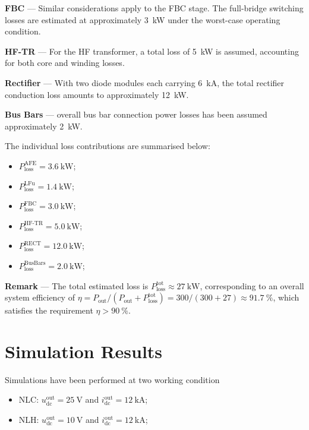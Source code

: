 \documentclass[12pt,a4paper]{scrartcl}
\begin{document}
\begin{onehalfspace}
\noindent\textbf{FBC} --- Similar considerations apply to the FBC stage.
The full-bridge switching losses are estimated at approximately
\SI{3}{\kilo\watt} under the worst-case operating condition.

\noindent\textbf{HF-TR} --- For the HF transformer, a total loss of
\SI{5}{\kilo\watt} is assumed, accounting for both core and winding losses.

\noindent\textbf{Rectifier} --- With two diode modules each carrying
\SI{6}{\kilo\ampere}, the total rectifier conduction loss amounts to
approximately \SI{12}{\kilo\watt}.

\noindent\textbf{Bus Bars} --- overall bus bar connection power losses has been assumed approximately \SI{2}{\kilo\watt}.

\noindent The individual loss contributions are summarised below:
\begin{itemize}
	\item[--] $P_\text{loss}^\text{AFE}   = \SI{3.6}{\kilo\watt}$;
	\item[--] $P_\text{loss}^\text{LFu}   = \SI{1.4}{\kilo\watt}$;
	\item[--] $P_\text{loss}^\text{FBC}   = \SI{3.0}{\kilo\watt}$;
	\item[--] $P_\text{loss}^\text{HF-TR} = \SI{5.0}{\kilo\watt}$;
	\item[--] $P_\text{loss}^\text{RECT}  = \SI{12.0}{\kilo\watt}$;	
	\item[--] $P_\text{loss}^\text{BusBars}  = \SI{2.0}{\kilo\watt}$;
\end{itemize}

\noindent\textbf{Remark} --- The total estimated loss is
$P_\text{loss}^\text{tot} \approx \SI{27}{\kilo\watt}$, corresponding to
an overall system efficiency of
$\eta = P_\text{out}/(P_\text{out}+P_\text{loss}^\text{tot})
= 300/(300+27) \approx \SI{91.7}{\percent}$,
which satisfies the requirement $\eta > \SI{90}{\percent}$.

\section{Simulation Results}\label{sec:sim}
Simulations have been performed at two working condition
\begin{itemize}
	\item[--] NLC: $u_\text{dc}^\text{out} = \SI{25}{\volt}$ and $i_\text{dc}^\text{out} = \SI{12}{\kilo\ampere}$;
	\item[--] NLH: $u_\text{dc}^\text{out} = \SI{10}{\volt}$ and $i_\text{dc}^\text{out} = \SI{12}{\kilo\ampere}$;
\end{itemize}


\end{onehalfspace}
\end{document}
